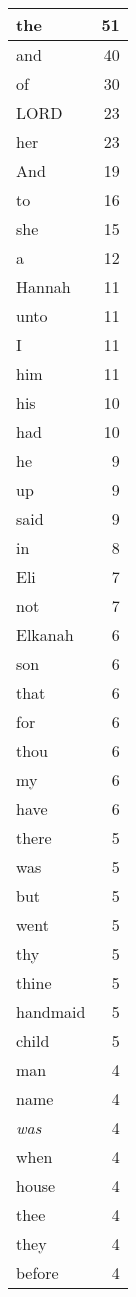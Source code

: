 \begin{center}
\begin{longtable}{l|r}
\hline \hline
\endlastfoot
the & 51 \\ \hline
and & 40 \\ \hline
of & 30 \\ \hline
LORD & 23 \\ \hline
her & 23 \\ \hline
And & 19 \\ \hline
to & 16 \\ \hline
she & 15 \\ \hline
a & 12 \\ \hline
Hannah & 11 \\ \hline
unto & 11 \\ \hline
I & 11 \\ \hline
him & 11 \\ \hline
his & 10 \\ \hline
had & 10 \\ \hline
he & 9 \\ \hline
up & 9 \\ \hline
said & 9 \\ \hline
in & 8 \\ \hline
Eli & 7 \\ \hline
not & 7 \\ \hline
Elkanah & 6 \\ \hline
son & 6 \\ \hline
that & 6 \\ \hline
for & 6 \\ \hline
thou & 6 \\ \hline
my & 6 \\ \hline
have & 6 \\ \hline
there & 5 \\ \hline
was & 5 \\ \hline
but & 5 \\ \hline
went & 5 \\ \hline
thy & 5 \\ \hline
thine & 5 \\ \hline
handmaid & 5 \\ \hline
child & 5 \\ \hline
man & 4 \\ \hline
name & 4 \\ \hline
\emph{was} & 4 \\ \hline
when & 4 \\ \hline
house & 4 \\ \hline
thee & 4 \\ \hline
they & 4 \\ \hline
before & 4 \\ \hline

\end{longtable}
\end{center}
